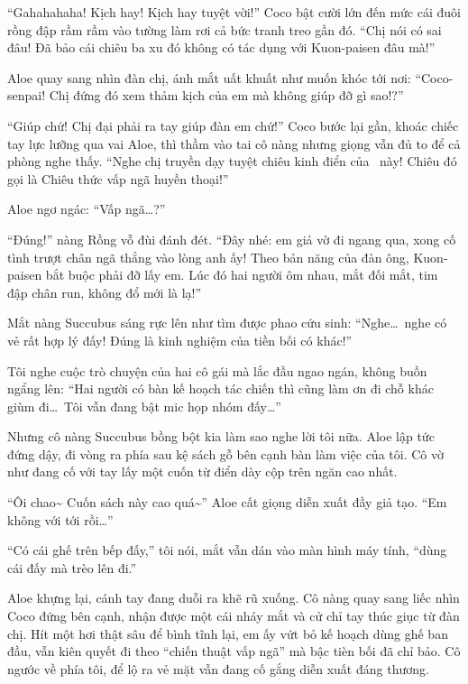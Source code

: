 \documentclass[../main.tex]{subfiles}
\begin{document}
``Gahahahaha! Kịch hay! Kịch hay tuyệt vời!'' Coco bật cười lớn đến mức cái đuôi rồng đập rầm rầm vào tường làm rơi cả bức tranh treo gần đó. ``Chị nói có sai đâu! Đã bảo cái chiêu ba xu đó không có tác dụng với Kuon-paisen đâu mà!''

Aloe quay sang nhìn đàn chị, ánh mắt uất khuất như muốn khóc tới nơi: ``Coco-senpai! Chị đứng đó xem thảm kịch của em mà không giúp đỡ gì sao!?''

``Giúp chứ! Chị đại phải ra tay giúp đàn em chứ!'' Coco bước lại gần, khoác chiếc tay lực lưỡng qua vai Aloe, thì thầm vào tai cô nàng nhưng giọng vẫn đủ to để cả phòng nghe thấy. ``Nghe chị truyền dạy tuyệt chiêu kinh điển của \hll\ này! Chiêu đó gọi là Chiêu thức vấp ngã huyền thoại!''

Aloe ngơ ngác: ``Vấp ngã\dots?''

``Đúng!'' nàng Rồng vỗ đùi đánh đét. ``Đây nhé: em giả vờ đi ngang qua, xong cố tình trượt chân ngã thẳng vào lòng anh ấy! Theo bản năng của đàn ông, Kuon-paisen bắt buộc phải đỡ lấy em. Lúc đó hai người ôm nhau, mắt đối mắt, tim đập chân run, không đổ mới là lạ!''

Mắt nàng Succubus sáng rực lên như tìm được phao cứu sinh: ``Nghe\dots\ nghe có vẻ rất hợp lý đấy! Đúng là kinh nghiệm của tiền bối có khác!''

Tôi nghe cuộc trò chuyện của hai cô gái mà lắc đầu ngao ngán, không buồn ngẩng lên: ``Hai người có bàn kế hoạch tác chiến thì cũng làm ơn đi chỗ khác giùm đi\dots\ Tôi vẫn đang bật mic họp nhóm đấy\dots''

Nhưng cô nàng Succubus bồng bột kia làm sao nghe lời tôi nữa. Aloe lập tức đứng dậy, đi vòng ra phía sau kệ sách gỗ bên cạnh bàn làm việc của tôi. Cô vờ như đang cố với tay lấy một cuốn từ điển dày cộp trên ngăn cao nhất.

``Ôi chao\~{} Cuốn sách này cao quá\~{}'' Aloe cất giọng diễn xuất đầy giả tạo. ``Em không với tới rồi\dots''

``Có cái ghế trên bếp đấy,'' tôi nói, mắt vẫn dán vào màn hình máy tính, ``dùng cái đấy mà trèo lên đi.''

Aloe khựng lại, cánh tay đang duỗi ra khẽ rũ xuống. Cô nàng quay sang liếc nhìn Coco đứng bên cạnh, nhận được một cái nháy mắt và cử chỉ tay thúc giục từ đàn chị. Hít một hơi thật sâu để bình tĩnh lại, em ấy vứt bỏ kế hoạch dùng ghế ban đầu, vẫn kiên quyết đi theo ``chiến thuật vấp ngã'' mà bậc tièn bối đã chỉ bảo. Cô ngước về phía tôi, để lộ ra vẻ mặt vẫn đang cố gắng diễn xuất đáng thương.
\end{document}
